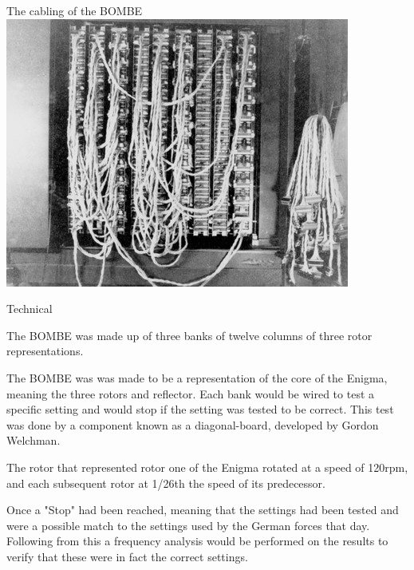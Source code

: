\documentclass[final]{beamer}
\begin{document}
\begin{frame}{}
\begin{columns}[t]
\begin{column}{.32\linewidth}
         \begin{block}{The cabling of the BOMBE}
          \includegraphics[width=\columnwidth]{bombeCable.png} 
        \end{block}
        
        \begin{block}{Technical}
          \begin{itemize}\small{
          \item The BOMBE was made up of three banks of twelve columns of three rotor representations.
          \item The BOMBE was was made to be a representation of the core of the Enigma, meaning the three rotors and reflector. Each bank would be wired to test a specific setting and would stop if the setting was tested to be correct. This test was done by a component known as a diagonal-board, developed by Gordon Welchman.
          \item The rotor that represented rotor one of the Enigma rotated at a speed of 120rpm, and each subsequent rotor at 1/26th the speed of its predecessor.
          \item Once a "Stop" had been reached, meaning that the settings had been tested and were a possible match to the settings used by the German forces that day. Following from this a frequency analysis would be performed on the results to verify that these were in fact the correct settings.}
          \end{itemize}
        \end{block}

      \end{column}
      

\end{columns}
\end{frame}
\end{document}
